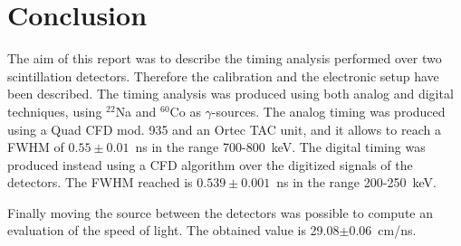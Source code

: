 \section*{Conclusion}
The aim of this report was to describe the timing analysis performed over two scintillation detectors. Therefore the calibration and the electronic setup have been described. The timing analysis was produced using both analog and digital techniques, using $^{22}$Na and $^{60}$Co as $\gamma$-sources. 
The analog timing was produced using a Quad CFD mod. 935 and an Ortec TAC unit, and it allows to reach a FWHM of $0.55\pm0.01$~ns in the range 700-800~keV. The digital timing was produced instead using a CFD algorithm over the digitized signals of the detectors. The FWHM reached is $0.539\pm0.001$~ns in the range 200-250~keV. 

Finally moving the source between the detectors was possible to compute an evaluation of the speed of light. The obtained value is 29.08$\pm$0.06~cm/ns.